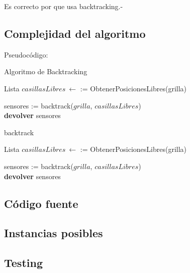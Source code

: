 Es correcto por que usa backtracking.-

\subsection{Complejidad del algoritmo}

Pseudocódigo:

\begin{algorithm}[H]
	\SetAlgoLined
	\caption{Algoritmo de Backtracking}
	
	Lista $casillasLibres\ \leftarrow$ := ObtenerPosicionesLibres(grilla)\\


	sensores := backtrack($grilla$, $casillasLibres$)\\

	\textbf{devolver} sensores
\end{algorithm}

\begin{algorithm}[H]
	\SetAlgoLined
	\caption{backtrack}
	
	Lista $casillasLibres\ \leftarrow$ := ObtenerPosicionesLibres(grilla)\\


	sensores := backtrack($grilla$, $casillasLibres$)\\
	
	\textbf{devolver} sensores
\end{algorithm}

\subsection{Código fuente}

\subsection{Instancias posibles}

\subsection{Testing}


